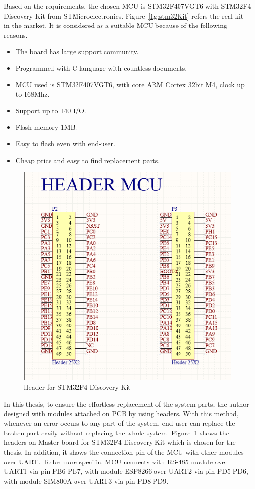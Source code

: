       Based on the requirements, the chosen MCU is STM32F407VGT6 with STM32F4 Discovery Kit from STMicroelectronics. Figure~\ref{fig:stm32Kit} refers the real kit in the market. It is considered as a suitable MCU because of the following reasons.
      \begin{itemize}
        \item The board has large support community.
        \item Programmed with C language with countless documents.
        \item MCU used is STM32F407VGT6, with core ARM Cortex 32bit M4, clock up to 168Mhz.
        \item Support up to 140 I/O.
        \item Flash memory 1MB.
        \item Easy to flash even with end-user.
        \item Cheap price and easy to find replacement parts.
      \end{itemize}
      \begin{figure}[!ht]
        \begin{center}
        \includegraphics{images/headerMcu.PNG}
        \caption{Header for STM32F4 Discovery Kit}
        \label{fig:headerMcu}
        \end{center}
      \end{figure}
      In this thesis, to ensure the effortless replacement of the system parts, the author designed with modules attached on PCB by using headers. With this method, whenever an error occurs to any part of the system, end-user can replace the broken part easily without replacing the whole system. Figure~\ref{fig:headerMcu} shows the headers on Master board for STM32F4 Discovery Kit which is chosen for the thesis. In addition, it shows the connection pin of the MCU with other modules over UART. To be more specific, MCU connects with RS-485 module over UART1 via pin PB6-PB7, with module ESP8266 over UART2 via pin PD5-PD6, with module SIM800A over UART3 via pin PD8-PD9.
